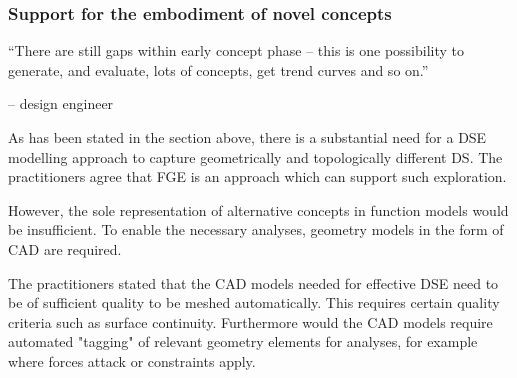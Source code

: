 \documentclass[aerospace,article,submit,moreauthors,pdftex]{Definitions/mdpi}
\begin{document}

\subsubsection{Support for the embodiment of novel concepts}




\begin{center}
    “There are still gaps within early concept phase – this is one possibility to generate, and evaluate, lots of concepts, get trend curves and so on.” 
\end{center}
\begin{flushright}
    -- design engineer
\end{flushright}


As has been stated in the section above, there is a substantial need for a \ac{DSE} modelling approach to capture geometrically and topologically different \ac{DS}.
The practitioners agree that \ac{FGE} is an approach which can support such exploration.

However, the sole representation of alternative concepts in function models would be insufficient.
To enable the necessary analyses, geometry models in the form of CAD are required.

The practitioners stated that the CAD models needed for effective \ac{DSE} need to be of sufficient quality to be meshed automatically.
This requires certain quality criteria such as surface continuity.
Furthermore would the CAD models require automated "tagging" of relevant geometry elements for analyses, for example where forces attack or constraints apply.
\end{document}
